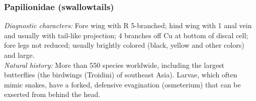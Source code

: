 \documentclass[letterpaper, 11pt]{article}
\begin{document}
\subsubsection{Papilionidae (swallowtails)}
\noindent{}\textit{Diagnostic characters:} Fore wing with R 5-branched; hind wing with 1 anal vein and usually with tail-like projection; 4 branches off Cu at bottom of discal cell; fore legs not reduced; usually brightly colored (black, yellow and other colors) and large.\\

\noindent{}\textit{Natural history:} More than 550 species worldwide, including the largest butterflies (the birdwings (Troidini) of southeast Asia). Larvae, which often mimic snakes, have a forked, defensive evagination (osmeterium) that can be exserted from behind the head.
\end{document}
